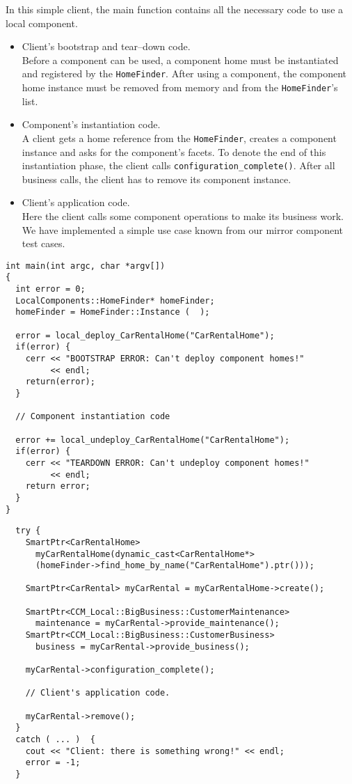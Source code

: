 In this simple client, the main function contains all the necessary code to use
a local component. 
\begin{itemize}
\item Client's bootstrap and tear--down code.\\
Before a component can be used, a component home must be instantiated and 
registered by the {\tt HomeFinder}.
After using a component, the component home instance must be removed from 
memory and from the {\tt HomeFinder}'s list.
\item Component's instantiation code. \\
A client gets a home reference from the {\tt HomeFinder}, creates a component 
instance and asks for the component's facets.
To denote the end of this instantiation phase, the client calls 
{\tt configuration\_complete()}.
After all business calls, the client has to remove its component instance.

\item Client's application code. \\
Here the client calls some component operations to make its business work.
We have implemented a simple use case known from our mirror component test 
cases.
\end{itemize}

\begin{small}
\begin{verbatim}
int main(int argc, char *argv[])
{
  int error = 0;
  LocalComponents::HomeFinder* homeFinder;
  homeFinder = HomeFinder::Instance (  );

  error = local_deploy_CarRentalHome("CarRentalHome");
  if(error) {
    cerr << "BOOTSTRAP ERROR: Can't deploy component homes!" 
         << endl;
    return(error);
  }

  // Component instantiation code

  error += local_undeploy_CarRentalHome("CarRentalHome");
  if(error) {
    cerr << "TEARDOWN ERROR: Can't undeploy component homes!" 
         << endl;
    return error;
  }
}
\end{verbatim}
\end{small}


\begin{small}
\begin{verbatim}
  try {
    SmartPtr<CarRentalHome> 
      myCarRentalHome(dynamic_cast<CarRentalHome*>
      (homeFinder->find_home_by_name("CarRentalHome").ptr()));

    SmartPtr<CarRental> myCarRental = myCarRentalHome->create();

    SmartPtr<CCM_Local::BigBusiness::CustomerMaintenance> 
      maintenance = myCarRental->provide_maintenance();    
    SmartPtr<CCM_Local::BigBusiness::CustomerBusiness> 
      business = myCarRental->provide_business();

    myCarRental->configuration_complete();

    // Client's application code.

    myCarRental->remove();
  } 
  catch ( ... )  {
    cout << "Client: there is something wrong!" << endl;
    error = -1;
  }
\end{verbatim}
\end{small}


